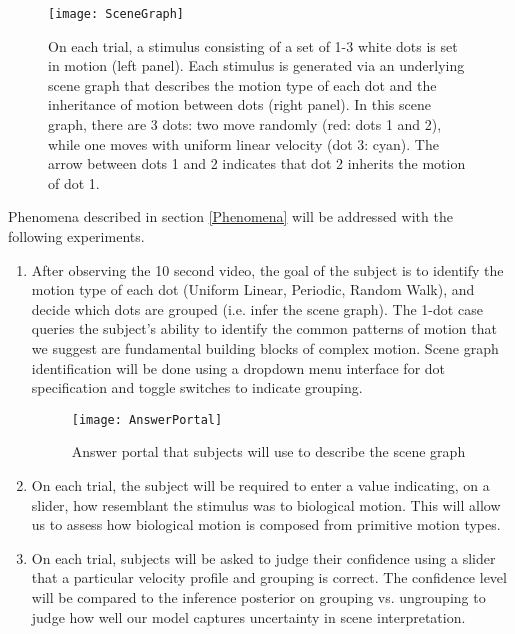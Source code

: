 \documentclass{scrartcl}
\begin{document}
\begin{figure}[h]
    \centering
    \texttt{[image: SceneGraph]}
    \caption{On each trial, a stimulus consisting of a set of 1-3 white dots is set in motion (left panel). Each stimulus is generated via an underlying scene graph that describes the motion type of each dot and the inheritance of motion between dots (right panel). In this scene graph, there are 3 dots: two move randomly (red: dots 1 and 2), while one moves with uniform linear velocity (dot 3: cyan). The arrow between dots 1 and 2 indicates that dot 2 inherits the motion of dot 1.}
    \label{fig:scenegraph}
\end{figure}

Phenomena described in section \ref{Phenomena} will be addressed with the following experiments.

\begin{enumerate}
  \item After observing the 10 second video, the goal of the subject is to identify the motion type of each dot (Uniform Linear, Periodic, Random Walk), and decide which dots are grouped (i.e. infer the scene graph). The 1-dot case queries the subject's ability to identify the common patterns of motion that we suggest are fundamental building blocks of complex motion. Scene graph identification will be done using a dropdown menu interface for dot specification and toggle switches to indicate grouping.

\begin{figure}[h]
    \centering
    \texttt{[image: AnswerPortal]}
    \caption{Answer portal that subjects will use to describe the scene graph}
    \label{fig:answerportal}
\end{figure}

  \item On each trial, the subject will be required to enter a value indicating, on a slider, how resemblant the stimulus was to biological motion. This will allow us to assess how biological motion is composed from primitive motion types. 
  \item On each trial, subjects will be asked to judge their confidence using a slider that a particular velocity profile and grouping is correct. The confidence level will be compared to the inference posterior on grouping vs. ungrouping to judge how well our model captures uncertainty in scene interpretation. 
\end{enumerate}
\end{document}

